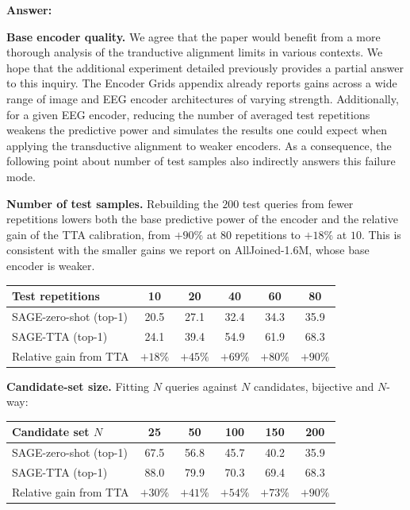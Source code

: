 \documentclass[11pt]{article}
\newcommand{\answer}[1]{{\textbf{Answer:} \color{blue} #1}}
\begin{document}
\answer{

\textbf{Base encoder quality.} We agree that the paper would benefit from a more thorough analysis of the tranductive alignment limits in various contexts. We hope that the additional experiment detailed previously provides a partial answer to this inquiry. The Encoder Grids appendix already reports gains across a wide range of image and EEG encoder architectures of varying strength. Additionally, for a given EEG encoder, reducing the number of averaged test repetitions weakens the predictive power and simulates the results one could expect when applying the transductive alignment to weaker encoders. As a consequence, the following point about number of test samples also indirectly answers this failure mode.

\textbf{Number of test samples.} Rebuilding the $200$ test queries from fewer repetitions lowers both
the base predictive power of the encoder and the relative gain of the TTA calibration, from $+90\%$ at
$80$ repetitions to $+18\%$ at $10$. This is consistent with the smaller gains we report on
AllJoined-1.6M, whose base encoder is weaker.

\begin{center}
\begin{tabular}{lccccc}
\hline
Test repetitions & 10 & 20 & 40 & 60 & 80 \\
\hline
SAGE-zero-shot (top-1) & 20.5 & 27.1 & 32.4 & 34.3 & 35.9 \\
SAGE-TTA (top-1)       & 24.1 & 39.4 & 54.9 & 61.9 & 68.3 \\
Relative gain from TTA & $+18\%$ & $+45\%$ & $+69\%$ & $+80\%$ & $+90\%$ \\
\hline
\end{tabular}
\end{center}

\textbf{Candidate-set size.} Fitting $N$ queries against $N$ candidates, bijective and $N$-way:

\begin{center}
\begin{tabular}{lccccc}
\hline
Candidate set $N$ & 25 & 50 & 100 & 150 & 200 \\
\hline
SAGE-zero-shot (top-1) & 67.5 & 56.8 & 45.7 & 40.2 & 35.9 \\
SAGE-TTA (top-1)       & 88.0 & 79.9 & 70.3 & 69.4 & 68.3 \\
Relative gain from TTA & $+30\%$ & $+41\%$ & $+54\%$ & $+73\%$ & $+90\%$ \\
\hline
\end{tabular}
\end{center}

}
\end{document}
